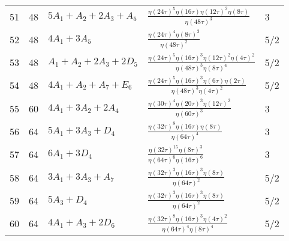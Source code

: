 \documentclass{article}
\theoremstyle{definition}
\begin{document}
\begin{longtable}{|l|l|l|l|l|}
  51 & 48 & $5 A_{1} +  A_{2} + 2 A_{3} +  A_{5}$ & ${\frac {  \eta \left( 24\tau \right)   ^{5}\eta \left( 16\tau \right)   \eta \left( 12\tau \right)   ^{2} \mbox{}\eta \left( 8\tau \right) }{  \eta \left( 48\tau \right)   ^{3}}}$ & 3 \\ 
  52 & 48 & $4 A_{1} + 3 A_{5}$ & ${\frac {  \eta \left( 24\tau \right)   ^{4}  \eta \left( 8\tau \right)   ^{3}}{  \eta \left( 48\tau \right)   ^{2}}}$ & 5/2 \\ 
  53 & 48 & $ A_{1} +  A_{2} + 2 A_{3} + 2 D_{5}$ & ${\frac {  \eta \left( 24\tau \right)   ^{5}  \eta \left( 16\tau \right)   ^{3}  \eta \left( 12\tau \right)   ^{2} \mbox{}  \eta \left( 4\tau \right)   ^{2}}{  \eta \left( 48\tau \right)   ^{3}  \eta \left( 8\tau \right)   ^{4}}}$ & 5/2 \\ 
  54 & 48 & $4 A_{1} +  A_{2} +  A_{7} +  E_{6}$ & ${\frac {  \eta \left( 24\tau \right)   ^{5}  \eta \left( 16\tau \right)   ^{3}\eta \left( 6\tau \right)  \mbox{}\eta \left( 2\tau \right) }{  \eta \left( 48\tau \right)   ^{3}  \eta \left( 4\tau \right)   ^{2}}}$ & 5/2 \\ 
  55 & 60 & $4 A_{1} + 3 A_{2} + 2 A_{4}$ & ${\frac {  \eta \left( 30\tau \right)   ^{4}  \eta \left( 20\tau \right)   ^{3}  \eta \left( 12\tau \right)   ^{2} \mbox{}}{  \eta \left( 60\tau \right)   ^{3}}}$ & 3 \\ 
  56 & 64 & $5 A_{1} + 3 A_{3} +  D_{4}$ & ${\frac {  \eta \left( 32\tau \right)   ^{8}\eta \left( 16\tau \right) \eta \left( 8\tau \right) }{  \eta \left( 64 \mbox{}\tau \right)   ^{4}}}$ & 3 \\ 
  57 & 64 & $6 A_{1} + 3 D_{4}$ & ${\frac {  \eta \left( 32\tau \right)   ^{15}  \eta \left( 8\tau \right)   ^{3}}{  \eta \left( 64\tau \right)   ^{6} \mbox{}  \eta \left( 16\tau \right)   ^{6}}}$ & 3 \\ 
  58 & 64 & $3 A_{1} + 3 A_{3} +  A_{7}$ & ${\frac {  \eta \left( 32\tau \right)   ^{3}  \eta \left( 16\tau \right)   ^{3}\eta \left( 8\tau \right)  \mbox{}}{  \eta \left( 64\tau \right)   ^{2}}}$ & 5/2 \\ 
  59 & 64 & $5 A_{3} +  D_{4}$ & ${\frac {  \eta \left( 32\tau \right)   ^{3}  \eta \left( 16\tau \right)   ^{3}\eta \left( 8\tau \right)  \mbox{}}{  \eta \left( 64\tau \right)   ^{2}}}$ & 5/2 \\ 
  60 & 64 & $4 A_{1} +  A_{3} + 2 D_{6}$ & ${\frac {  \eta \left( 32\tau \right)   ^{8}  \eta \left( 16\tau \right)   ^{3}  \eta \left( 4\tau \right)   ^{2} \mbox{}}{  \eta \left( 64\tau \right)   ^{4}  \eta \left( 8\tau \right)   ^{4}}}$ & 5/2 \\ 

\end{longtable}
\end{document}
